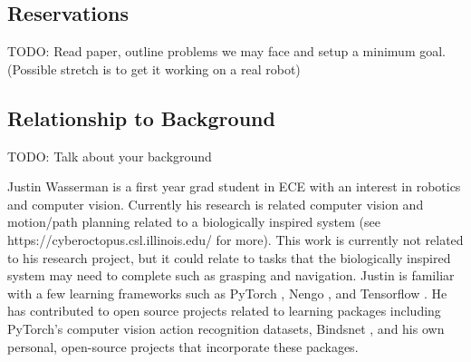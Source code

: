 \documentclass[10pt,twocolumn,letterpaper]{article}
\begin{document}



\subsection{Reservations}
TODO: Read paper, outline problems we may face and setup a minimum goal. (Possible stretch is to get it working on a real robot)



\subsection{Relationship to Background}
TODO: Talk about your background

Justin Wasserman is a first year grad student in ECE with an interest in robotics and computer vision. Currently his research is related computer vision and motion/path planning related to a biologically inspired system (see https://cyberoctopus.csl.illinois.edu/ for more). This work is currently not related to his research project, but it could relate to tasks that the biologically inspired system may need to complete such as grasping and navigation. Justin is familiar with a few learning frameworks such as PyTorch \cite{paszkeAutomaticDifferentiationPyTorch}, Nengo \cite{bekolayNengoPythonTool2014}, and Tensorflow \cite{abadiTensorFlowLargeScaleMachine2016}. He has contributed to open source projects related to learning packages including PyTorch's computer vision action recognition datasets, Bindsnet \cite{hazanBindsNETMachineLearningOriented2018}, and his own personal, open-source projects that incorporate these packages.



{\small


}
\end{document}
